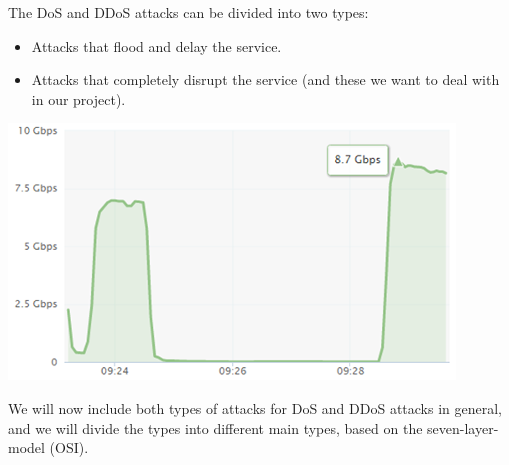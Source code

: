 \documentclass{article}
\begin{document}
\hfill \break The DoS and DDoS attacks can be divided into two types: 
\begin{itemize}
\item 	Attacks that flood and delay the service.
\item	Attacks that completely disrupt the service (and these we want to deal with in our project).

\end{itemize}
    \begin{center}
        \includegraphics{ddos-attack-traffic-gbps}
    \end{center}

 \hfill \break We will now include both types of attacks for DoS and DDoS attacks in general, and we will divide the types into different main types, based on the seven-layer-model (OSI).
\end{document}
